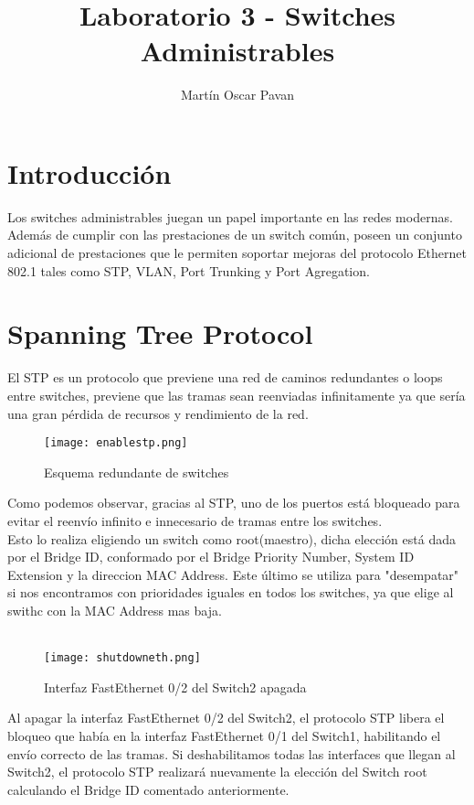 \documentclass{article}
\title{Laboratorio 3 - Switches Administrables}
\author{Martín Oscar Pavan}
\begin{document}
\maketitle

\section{Introducción}
Los switches administrables juegan un papel importante en las redes modernas. Además de cumplir con las prestaciones de un switch común, poseen un conjunto adicional de prestaciones que le permiten soportar mejoras del protocolo Ethernet 802.1 tales como STP, VLAN, Port Trunking y Port Agregation. 
\section{Spanning Tree Protocol}
El STP es un protocolo que previene una red de caminos redundantes o loops entre switches, previene que las tramas sean reenviadas infinitamente ya que sería una gran pérdida de recursos y rendimiento de la red.
\begin{figure}[H]
    \centering
    \texttt{[image: enablestp.png]}
    \caption{Esquema redundante de switches}
    \label{fig:enter-label}
\end{figure}
Como podemos observar, gracias al STP, uno de los puertos está bloqueado para evitar el reenvío infinito e innecesario de tramas entre los switches.
\\
Esto lo realiza eligiendo un switch como root(maestro), dicha elección está dada por el Bridge ID, conformado por el Bridge Priority Number, System ID Extension y la direccion MAC Address. Este último se utiliza para "desempatar" si nos encontramos con prioridades iguales en todos los switches, ya que elige al swithc con la MAC Address mas baja.
\\\\
\begin{figure}[H]
    \centering
    \texttt{[image: shutdowneth.png]}
    \caption{Interfaz FastEthernet 0/2 del Switch2 apagada}
    \label{fig:enter-label}
\end{figure}
Al apagar la interfaz FastEthernet 0/2 del Switch2, el protocolo STP libera el bloqueo que había en la interfaz FastEthernet 0/1 del Switch1, habilitando el envío correcto de las tramas. Si deshabilitamos todas las interfaces que llegan al Switch2, el protocolo STP realizará nuevamente la elección del Switch root calculando el Bridge ID comentado anteriormente.
\end{document}

